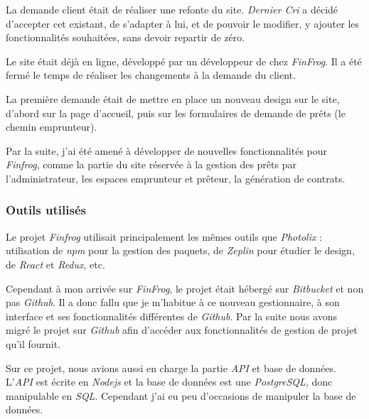 \documentclass[12pt,a4paper]{article}
\begin{document}
  \bigskip
  La demande client était de réaliser une refonte du site. \emph{Dernier
  Cri} a décidé d'accepter cet existant, de s'adapter à lui, et de pouvoir
  le modifier, y ajouter les fonctionnalités souhaitées, sans devoir
  repartir de zéro.

  \bigskip

  Le site était déjà en ligne, développé par un développeur de chez
  \emph{FinFrog}. Il a été fermé le temps de réaliser les changements à la
  demande du client.

  \bigskip

  La première demande était de mettre en place un nouveau design sur le
  site, d'abord sur la page d'accueil, puis sur les formulaires de demande
  de prêts (le chemin emprunteur).

  \bigskip

  Par la suite, j'ai été amené à développer de nouvelles fonctionnalités
  pour \emph{Finfrog}, comme la partie du site réservée à la gestion des
  prêts par l'administrateur, les espaces emprunteur et prêteur, la
  génération de contrats.

  \bigskip

  \subsubsection{Outils utilisés}\label{outils-utilisuxe9s-1}

  \bigskip

  Le projet \emph{Finfrog} utilisait principalement les mêmes outils que
  \emph{Photolix} : utilisation de \emph{npm} pour la gestion des paquets,
  de \emph{Zeplin} pour étudier le design, de \emph{React} et
  \emph{Redux}, etc.

  \bigskip

  Cependant à mon arrivée sur \emph{FinFrog}, le projet était hébergé sur
  \emph{Bitbucket} et non pas \emph{Github}. Il a donc fallu que je
  m'habitue à ce nouveau gestionnaire, à son interface et ses
  fonctionnalités différentes de \emph{Github}. Par la suite nous avons
  migré le projet sur \emph{Github} afin d'accéder aux fonctionnalités de
  gestion de projet qu'il fournit.

  \bigskip

  Sur ce projet, nous avions aussi en charge la partie \emph{API} et base
  de données. L'\emph{API} est écrite en \emph{Nodejs} et la base de
  données est une \emph{PostgreSQL}, donc manipulable en \emph{SQL}.
  Cependant j'ai eu peu d'occasions de manipuler la base de données.
\end{document}
